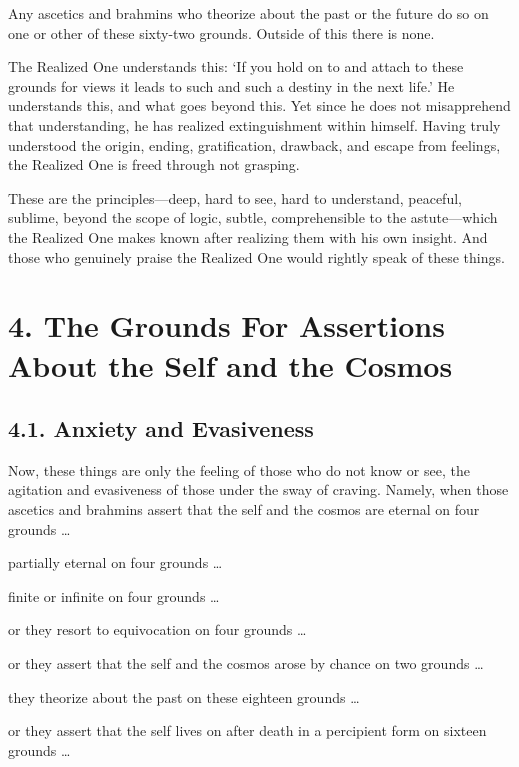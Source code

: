 \documentclass[12pt,openany]{book}%
\begin{document}
Any ascetics and brahmins who theorize about the past or the future do so on one or other of these sixty-two grounds. Outside of this there is none. 

The Realized One understands this: ‘If you hold on to and attach to these grounds for views it leads to such and such a destiny in the next life.’ He understands this, and what goes beyond this. Yet since he does not misapprehend that understanding, he has realized extinguishment within himself. Having truly understood the origin, ending, gratification, drawback, and escape from feelings, the Realized One is freed through not grasping. 

These are the principles—deep, hard to see, hard to understand, peaceful, sublime, beyond the scope of logic, subtle, comprehensible to the astute—which the Realized One makes known after realizing them with his own insight. And those who genuinely praise the Realized One would rightly speak of these things. 

\section*{4. The Grounds For Assertions About the Self and the Cosmos }

\subsection*{4.1. Anxiety and Evasiveness }

Now, these things are only the feeling of those who do not know or see, the agitation and evasiveness of those under the sway of craving. Namely, when those ascetics and brahmins assert that the self and the cosmos are eternal on four grounds … 

partially eternal on four grounds … 

finite or infinite on four grounds … 

or they resort to equivocation on four grounds … 

or they assert that the self and the cosmos arose by chance on two grounds … 

they theorize about the past on these eighteen grounds … 

or they assert that the self lives on after death in a percipient form on sixteen grounds … 
\end{document}
